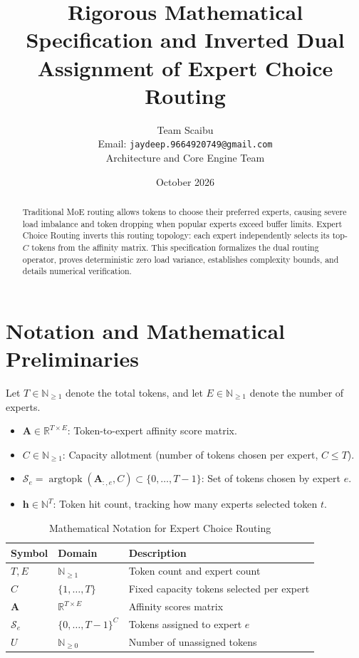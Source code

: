 \documentclass[11pt,a4paper]{article}
\title{\textbf{Rigorous Mathematical Specification and Inverted Dual Assignment of Expert Choice Routing}}
\author{Team Scaibu \\ \small Email: \texttt{jaydeep.9664920749@gmail.com} \\ \small Architecture and Core Engine Team}
\date{October 2026}
\theoremstyle{definition}
\begin{document}
\maketitle

\begin{abstract}
Traditional MoE routing allows tokens to choose their preferred experts, causing severe load imbalance and token dropping when popular experts exceed buffer limits. Expert Choice Routing inverts this routing topology: each expert independently selects its top-$C$ tokens from the affinity matrix. This specification formalizes the dual routing operator, proves deterministic zero load variance, establishes complexity bounds, and details numerical verification.
\end{abstract}

\section{Notation and Mathematical Preliminaries}

Let $T \in \mathbb{N}_{\ge 1}$ denote the total tokens, and let $E \in \mathbb{N}_{\ge 1}$ denote the number of experts.

\begin{itemize}
    \item $\mathbf{A} \in \mathbb{R}^{T \times E}$: Token-to-expert affinity score matrix.
    \item $C \in \mathbb{N}_{\ge 1}$: Capacity allotment (number of tokens chosen per expert, $C \le T$).
    \item $\mathcal{S}_e = \operatorname{argtopk}(\mathbf{A}_{:, e}, C) \subset \{0, \dots, T-1\}$: Set of tokens chosen by expert $e$.
    \item $\mathbf{h} \in \mathbb{N}^T$: Token hit count, tracking how many experts selected token $t$.
\end{itemize}

\begin{table}[h]
\centering
\caption{Mathematical Notation for Expert Choice Routing}
\begin{tabular}{lll}
\toprule
\textbf{Symbol} & \textbf{Domain} & \textbf{Description} \\
\midrule
$T, E$ & $\mathbb{N}_{\ge 1}$ & Token count and expert count \\
$C$ & $\{1, \dots, T\}$ & Fixed capacity tokens selected per expert \\
$\mathbf{A}$ & $\mathbb{R}^{T \times E}$ & Affinity scores matrix \\
$\mathcal{S}_e$ & $\{0, \dots, T-1\}^C$ & Tokens assigned to expert $e$ \\
$U$ & $\mathbb{N}_{\ge 0}$ & Number of unassigned tokens \\
\bottomrule
\end{tabular}
\end{table}
\end{document}
